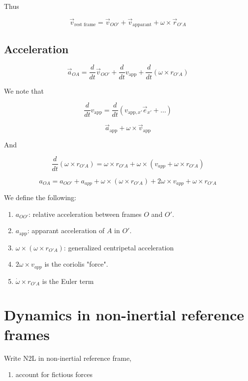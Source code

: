 \documentclass{article}
\newtheorem{one minute paper}[theorem]{One Minute Paper}
\begin{document}
Thus 

\begin{equation}
    \vec{v}_{\text{rest frame}} = \vec{v}_{OO'} + \vec{v}_{\text{apparant}} + \omega \times \vec{r}_{O'A}
\end{equation}

\subsection*{Acceleration}

\begin{equation}
    \vec{a}_{OA} = \frac{d}{dt}\vec{v}_{OO'} + \frac{d}{dt}v_{\text{app}} + \frac{d}{dt}(\omega \times r_{O'A})
\end{equation}

We note that 

\begin{equation}
    \frac{d}{dt}v_{\text{app}} = \frac{d}{dt}(v_{\text{app}, x'}\vec{e}_{x'} + \dots)
\end{equation}

\begin{equation}
    \vec{a}_{\text{app}} + \omega \times \vec{v}_{\text{app}}
\end{equation}

And 

\begin{equation}
    \frac{d}{dt}(\omega \times r_{O'A}) = \omega \times r_{O'A} + \omega \times (v_{app} + \omega \times r_{O'A})
\end{equation}

\begin{equation}
    a_{OA} = a_{OO'} + a_{app} + \omega \times (\omega \times r_{O'A}) + 2\omega \times v_{app} + \omega \times r_{O'A}
\end{equation}

We define the following:
\begin{enumerate}
    \item $a_{OO'}$: relative acceleration between frames $O$ and $O'$.
    \item $a_{\text{app}}$: apparant acceleration of $A$ in $O'$. 
    \item $\omega \times (\omega \times r_{O'A})$: generalized centripetal acceleration
    \item $2\omega \times v_{app}$ is the coriolis "force". 
    \item $\dot{\omega} \times r_{O'A}$ is the Euler term
\end{enumerate}

\section*{Dynamics in non-inertial reference frames}

Write N2L in non-inertial reference frame, 
\begin{enumerate}
    \item account for fictious forces
\end{enumerate}
\end{document}
